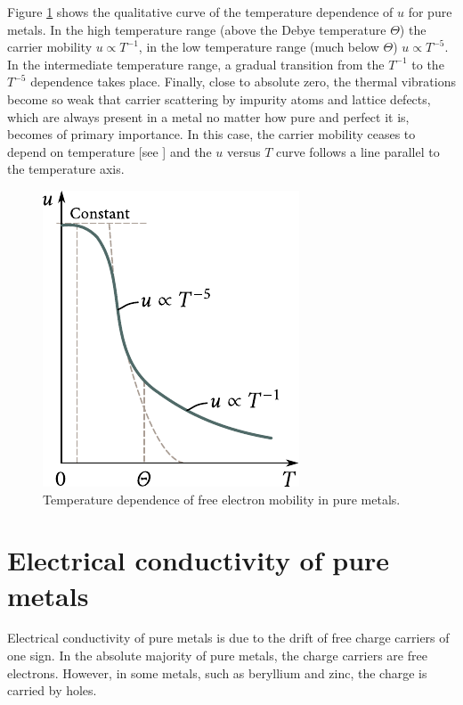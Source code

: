 Figure \ref{fig:6_9} shows the qualitative curve of the temperature dependence of $u$ for pure metals. In the high temperature range (above the Debye temperature $\Theta$) the carrier mobility $u\propto T^{-1}$, in the low temperature range (much below $\Theta$) $u\propto T^{-5}$. In the intermediate temperature
range, a gradual transition from the $T^{-1}$ to the $T^{-5}$ dependence takes place. Finally, close to absolute zero, the thermal vibrations become so weak that carrier scattering by impurity atoms and lattice defects, which are always present in a metal no matter how pure and perfect it is, becomes of primary importance. In this case, the carrier mobility ceases to depend on temperature [see ] and the $u$ versus $T$ curve follows a line parallel to the temperature axis.

\begin{figure}[t]
	\begin{center}
		\includegraphics[scale=1]{figures/ch_06/fig_6_9.pdf}
		\caption[]{Temperature dependence of free electron mobility in pure metals.}
		\label{fig:6_9}
	\end{center}
	\vspace{-0.7cm}
\end{figure}

\section{Electrical conductivity of pure metals}\label{sec:54}

Electrical conductivity of pure metals is due to the drift of free charge carriers of one sign. In the absolute majority of pure metals, the charge carriers are free electrons. However, in some metals, such as beryllium and zinc, the charge is carried by holes.


